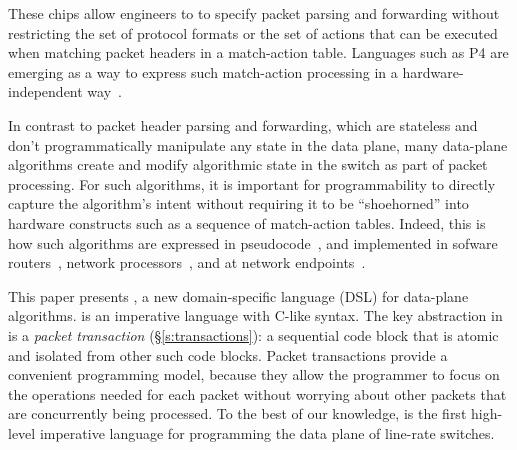 These chips allow engineers to to specify packet parsing and
forwarding without restricting the set of protocol formats or the set
of actions that can be executed when matching packet headers in a
match-action table. Languages such as P4 are emerging as a way to
express such match-action processing in a hardware-independent
way~\cite{p4,p4spec,dc_p4}.


In contrast to packet header parsing and forwarding, which are stateless
and don't programmatically manipulate any state in the data plane, many data-plane algorithms
create and modify algorithmic state in the switch as part of packet
processing. For such algorithms, it is important for programmability to
directly capture the algorithm's intent without requiring it to be
``shoehorned'' into hardware constructs such as a sequence of
match-action tables. Indeed, this is how such algorithms are expressed
in pseudocode~\cite{red, csfq, codel_code, avq, blue}, and implemented
in sofware routers~\cite{click, dpdk, routebricks}, network
processors~\cite{packetc, nova}, and at network
endpoints~\cite{qdisc}.

This paper presents \pktlanguage, a new domain-specific language (DSL)
for data-plane algorithms.  \pktlanguage is an imperative language
with C-like syntax. The key abstraction in \pktlanguage is a {\em
  packet transaction} (\S\ref{s:transactions}): a sequential code
block that is atomic and isolated from other such code blocks. Packet
transactions provide a convenient programming model, because they
allow the programmer to focus on the operations needed for each packet
without worrying about other packets that are concurrently being
processed. To the best of our knowledge, \pktlanguage is the first
high-level imperative language for programming the data plane of
line-rate switches.

